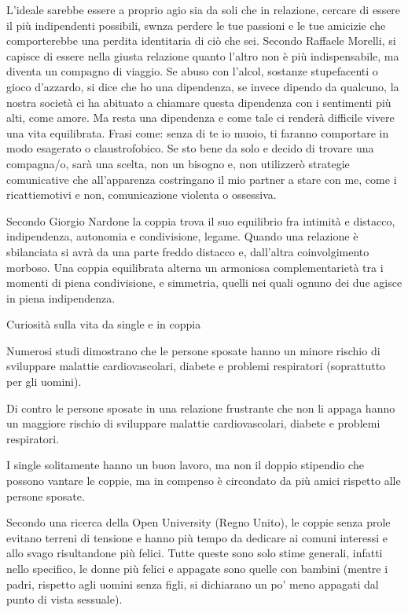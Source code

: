 \documentclass[12pt]{book} %
\begin{document}
L'ideale sarebbe essere a proprio agio sia da soli che in relazione, cercare di essere il più indipendenti possibili, swnza perdere le tue passioni e le tue amicizie che comporterebbe una perdita identitaria di ciò che sei. 
Secondo Raffaele Morelli, si capisce di essere nella giusta relazione quanto
l'altro non è più indispensabile, ma diventa un compagno di
viaggio. Se abuso con l'alcol, sostanze stupefacenti o
gioco d'azzardo, si dice che ho una dipendenza, se invece dipendo da qualcuno, la nostra società ci ha abituato a chiamare questa dipendenza con i sentimenti più alti, come amore. Ma resta una dipendenza e come tale ci renderà difficile vivere una vita equilibrata. Frasi come: senza di
te io muoio, ti faranno comportare in modo esagerato o claustrofobico. Se sto bene da solo e decido di trovare una
compagna/o, sarà una scelta, non un bisogno e, non utilizzerò strategie comunicative che
all'apparenza costringano il mio partner a stare con me, come i ricattiemotivi e non, comunicazione violenta o ossessiva.

Secondo Giorgio Nardone la coppia trova il suo equilibrio fra intimità e distacco, indipendenza, autonomia e condivisione,
legame. Quando una relazione è sbilanciata si avrà da una parte freddo distacco e, dall'altra
coinvolgimento morboso. Una coppia equilibrata alterna un armoniosa complementarietà tra i momenti di piena
condivisione, e simmetria, quelli nei quali ognuno dei due agisce in piena indipendenza. 


\bigskip
\begin{mdframed}[linewidth=1pt]
Curiosità sulla vita da single e in coppia

Numerosi studi dimostrano che le persone sposate hanno un minore rischio di sviluppare malattie cardiovascolari, diabete
e problemi respiratori (soprattutto per gli uomini).

Di contro le persone sposate in una relazione frustrante che non li appaga hanno un maggiore rischio di sviluppare
malattie cardiovascolari, diabete e problemi respiratori.

I single solitamente hanno un buon lavoro, ma non il doppio stipendio che possono vantare le coppie, ma in compenso è
circondato da più amici rispetto alle persone sposate.

\bigskip

Secondo una ricerca della Open University (Regno
Unito), le coppie senza prole evitano terreni di tensione e hanno più tempo da dedicare ai comuni interessi e allo svago
risultandone più felici. Tutte queste sono solo stime generali, infatti nello specifico, le donne più felici e appagate
sono quelle con bambini (mentre i padri, rispetto agli uomini senza figli, si dichiarano un po' meno appagati dal punto
di vista sessuale).
\end{mdframed}
\end{document}
